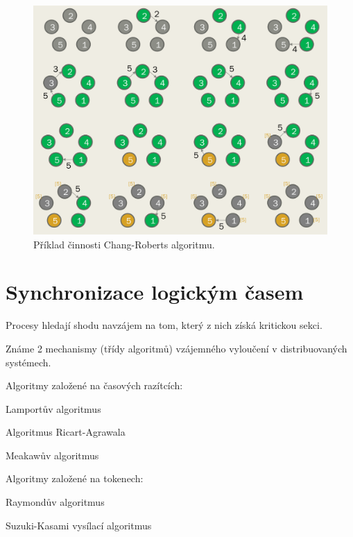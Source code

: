 \begin{compactitem}
    \begin{figure}[H]
        \centering
        \includegraphics[width=1\linewidth]{chang_roberts.pdf}
        \caption{Příklad činnosti Chang-Roberts algoritmu.}
    \end{figure}
\end{compactitem}


\section{Synchronizace logickým časem}

\begin{compactitem}
    \item Procesy hledají shodu navzájem na tom, který z nich získá kritickou sekci.

    \item Známe 2 mechanismy (třídy algoritmů) vzájemného vyloučení v distribuovaných systémech.

    \item Algoritmy založené na časových razítcích: \begin{compactitem}
        \item Lamportův algoritmus
        \item Algoritmus Ricart-Agrawala
        \item Meakawův algoritmus
    \end{compactitem}

    \item Algoritmy založené na tokenech: \begin{compactitem}
        \item Raymondův algoritmus
        \item Suzuki-Kasami vysílací algoritmus
    \end{compactitem}
\end{compactitem}

